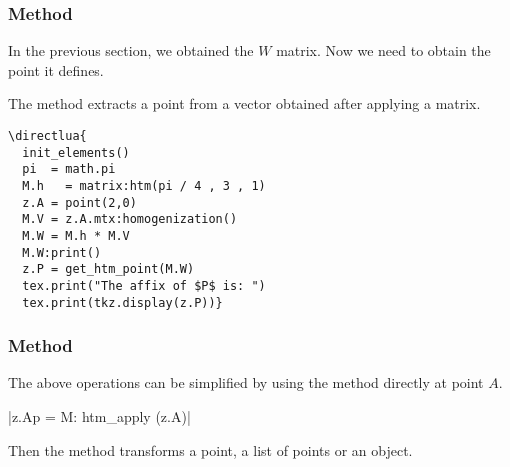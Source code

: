 \subsubsection{Method } %
\label{ssub:method_get_htm_point}

In the previous section, we obtained the $W$ matrix. Now we need to obtain the point it defines.

The  method   extracts a point from a vector obtained after applying a  matrix.

\begin{minipage}{.5\textwidth}
\begin{verbatim}
\directlua{
  init_elements()
  pi  = math.pi
  M.h   = matrix:htm(pi / 4 , 3 , 1)
  z.A = point(2,0)
  M.V = z.A.mtx:homogenization()
  M.W = M.h * M.V
  M.W:print()
  z.P = get_htm_point(M.W)
  tex.print("The affix of $P$ is: ")
  tex.print(tkz.display(z.P))}
\end{verbatim}
\end{minipage}
\begin{minipage}{.5\textwidth}
\end{minipage}


\subsubsection{Method } %
\label{ssub:method_code_htm__apply}
The above operations can be simplified by using the  method directly at point $A$.

\begin{mybox}
|z.Ap = M: htm_apply (z.A)|\\
\end{mybox}

Then the method  transforms a point, a list of points or an object.


